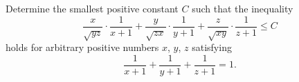 \problem
Determine the smallest positive constant $C$ such that the inequality
\[
   \frac{x}{\sqrt{yz}} \cdot \frac{1}{x+1}
   +
   \frac{y}{\sqrt{zx}} \cdot \frac{1}{y+1}
   +
   \frac{z}{\sqrt{xy}} \cdot \frac{1}{z+1}
\leq
   C
\]
holds for arbitrary positive numbers $x$, $y$, $z$ satisfying
\[
   \frac{1}{x+1} + \frac{1}{y+1} + \frac{1}{z+1}
=
   1
.\]
\solution
\endproblem
